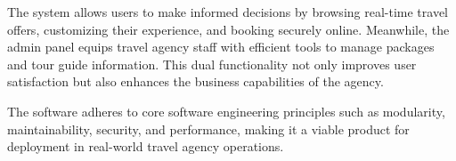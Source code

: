 The system allows users to make informed decisions by browsing real-time travel offers, customizing their experience, and booking securely online. Meanwhile, the admin panel equips travel agency staff with efficient tools to manage packages and tour guide information. This dual functionality not only improves user satisfaction but also enhances the business capabilities of the agency.

The software adheres to core software engineering principles such as modularity, maintainability, security, and performance, making it a viable product for deployment in real-world travel agency operations.
